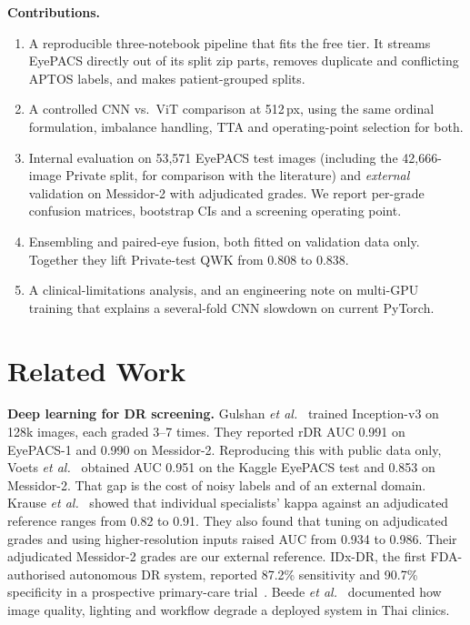 \documentclass[conference,a4paper]{IEEEtran}
\begin{document}
\textbf{Contributions.}
\begin{enumerate}
\item A reproducible three-notebook pipeline that fits the free tier. It streams EyePACS directly out of its split zip parts, removes duplicate and conflicting APTOS labels, and makes patient-grouped splits.
\item A controlled CNN vs.\ ViT comparison at 512\,px, using the same ordinal formulation, imbalance handling, TTA and operating-point selection for both.
\item Internal evaluation on 53,571 EyePACS test images (including the 42,666-image Private split, for comparison with the literature) and \emph{external} validation on Messidor-2 with adjudicated grades. We report per-grade confusion matrices, bootstrap CIs and a screening operating point.
\item Ensembling and paired-eye fusion, both fitted on validation data only. Together they lift Private-test QWK from 0.808 to 0.838.
\item A clinical-limitations analysis, and an engineering note on multi-GPU training that explains a several-fold CNN slowdown on current PyTorch.
\end{enumerate}

\section{Related Work}
\textbf{Deep learning for DR screening.}
Gulshan \emph{et al.}~\cite{gulshan} trained Inception-v3 on 128k images, each graded 3--7 times. They reported rDR AUC 0.991 on EyePACS-1 and 0.990 on Messidor-2.
Reproducing this with public data only, Voets \emph{et al.}~\cite{voets} obtained AUC 0.951 on the Kaggle EyePACS test and 0.853 on Messidor-2. That gap is the cost of noisy labels and of an external domain.
Krause \emph{et al.}~\cite{krause} showed that individual specialists' kappa against an adjudicated reference ranges from 0.82 to 0.91. They also found that tuning on adjudicated grades and using higher-resolution inputs raised AUC from 0.934 to 0.986. Their adjudicated Messidor-2 grades are our external reference.
IDx-DR, the first FDA-authorised autonomous DR system, reported 87.2\% sensitivity and 90.7\% specificity in a prospective primary-care trial~\cite{abramoff}.
Beede \emph{et al.}~\cite{beede} documented how image quality, lighting and workflow degrade a deployed system in Thai clinics.
\end{document}
